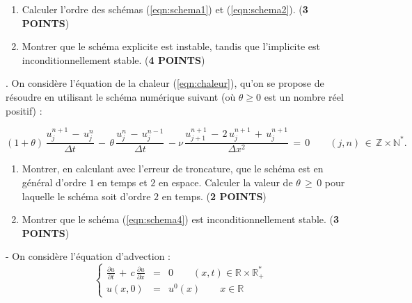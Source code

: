 \documentclass[12pt,a4paper]{article}
\begin{document}
\begin{enumerate}
\item Calculer l'ordre des sch\'emas (\ref{eqn:schema1})  et  (\ref{eqn:schema2}). ({\bf 3
    POINTS})
\newpage
\item Montrer que le sch\'ema explicite est instable, tandis que
  l'implicite est inconditionnellement stable. ({\bf 4 POINTS})
\end{enumerate}
\vspace{22cm}
. On consid\`ere l'\'equation de la chaleur (\ref{eqn:chaleur}), qu'on se propose de r\'esoudre en utilisant le sch\'ema num\'erique suivant (o\`u $\theta \ge 0$ est un nombre r\'eel positif) :

\begin{equation} \label{eqn:schema4}
\displaystyle (1+\theta) \, \frac{u_j^{n+1} \, - \, u_j^n}{\Delta t}
\, - \,\theta\, \frac{u_j^n \, - \, u_j^{n-1}}{\Delta t} \, - \nu \,  \frac{u_{j+1}^{n+1} \,- \,  2 \, u_j^{n+1} \, + \, u_j^{n+1}}{\Delta x ^2 } \,  =  \,   0 \qquad (j,n) \, \in \, \mathbb{Z}\times \mathbb{N}^* .
\end{equation}

\begin{enumerate}
\item Montrer, en calculant avec l'erreur de troncature,
  que le sch\'ema est en g\'en\'eral d'ordre $1$ en temps et $2$ en
  espace. Calculer la valeur de $\theta \, \ge \, 0$ pour laquelle le
  sch\'ema soit d'ordre $2$ en temps. ({\bf 2 POINTS})
\vspace{12cm}
\item Montrer que le sch\'ema (\ref{eqn:schema4}) est
  inconditionnellement stable. ({\bf 3 POINTS})
\end{enumerate}
\newpage
{} - On consid\`ere l'\'equation d'advection : \\

\begin{equation} \label{eqn:transport}
\left\{ 
\begin{array}{rcl}
\displaystyle \frac{\partial u}{\partial t} \, + \, c \, \frac{\partial u}{\partial x} & = & 0 \qquad (x,t) \in \mathbb{R} \times \mathbb{R}^*_+ \\
u(x,0) &= &\displaystyle u^0(x) \qquad x \in \mathbb{R}
\end{array}
\right.
\end{equation}
\end{document}
